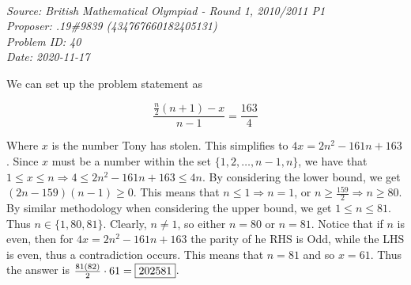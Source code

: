 \SSbreak\\
\emph{Source: British Mathematical Olympiad - Round 1, 2010/2011 P1}\\
\emph{Proposer: .19\#9839 (434767660182405131)}\\
\emph{Problem ID: 40}\\
\emph{Date: 2020-11-17}\\
\SSbreak
        
\bigskip
   
\begin{solution}\hfil\medskip 
   
    We can set up the problem statement as 
    
    \begin{equation*}
        \frac{\frac{n}{2}(n+1)-x}{n-1}=\frac{163}{4}
    \end{equation*}
                
    Where \(x\) is the number Tony has stolen.
	This simplifies to \(4x=2n^2-161n+163\).
	Since \(x\) must be a number within the set \(\{1,2,\ldots,n-1,n\}\), we have that \(1\leq x\leq n\Rightarrow 4\leq 2n^2-161n+163\leq4n\).
	By considering the lower bound, we get $(2n-159)(n-1)\geq 0$.
	This means that \(n\leq 1\Rightarrow n=1\), or \(n\geq \frac{159}{2}\Rightarrow n\geq 80\).
	By similar methodology when considering the upper bound, we get \(1\leq n\leq 81\).
	Thus \(n\in\{1,80,81\}\).
	Clearly, \(n\ne 1\), so either \(n=80\) or \(n=81\).
	Notice that if \(n\) is even, then for \(4x=2n^2-161n+163\) the parity of he RHS is Odd, while the LHS is even, thus a contradiction occurs.
	This means that \(n=81\) and so \(x=61\). Thus the answer is \(\frac{81(82)}{2}\cdot61=\fbox{202581}\).
\end{solution}\bigskip